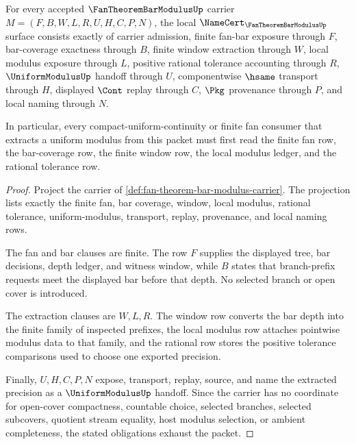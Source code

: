 \begin{theorem}
\label{thm:fan-theorem-bar-modulus-namecert-obligations}
For every accepted $\FanTheoremBarModulusUp$ carrier $M=(F,B,W,L,R,U,H,C,P,N)$, the local $\NameCert_{\FanTheoremBarModulusUp}$ surface consists exactly of carrier admission, finite fan-bar exposure through $F$, bar-coverage exactness through $B$, finite window extraction through $W$, local modulus exposure through $L$, positive rational tolerance accounting through $R$, $\UniformModulusUp$ handoff through $U$, componentwise $\hsame$ transport through $H$, displayed $\Cont$ replay through $C$, $\Pkg$ provenance through $P$, and local naming through $N$.

In particular, every compact-uniform-continuity or finite fan consumer that extracts a uniform modulus from this packet must first read the finite fan row, the bar-coverage row, the finite window row, the local modulus ledger, and the rational tolerance row.
\end{theorem}
\begin{proof}
Project the carrier of \autoref{def:fan-theorem-bar-modulus-carrier}. The projection lists exactly the finite fan, bar coverage, window, local modulus, rational tolerance, uniform-modulus, transport, replay, provenance, and local naming rows.

The fan and bar clauses are finite. The row $F$ supplies the displayed tree, bar decisions, depth ledger, and witness window, while $B$ states that branch-prefix requests meet the displayed bar before that depth. No selected branch or open cover is introduced.

The extraction clauses are $W,L,R$. The window row converts the bar depth into the finite family of inspected prefixes, the local modulus row attaches pointwise modulus data to that family, and the rational row stores the positive tolerance comparisons used to choose one exported precision.

Finally, $U,H,C,P,N$ expose, transport, replay, source, and name the extracted precision as a $\UniformModulusUp$ handoff. Since the carrier has no coordinate for open-cover compactness, countable choice, selected branches, selected subcovers, quotient stream equality, host modulus selection, or ambient completeness, the stated obligations exhaust the packet.
\end{proof}


